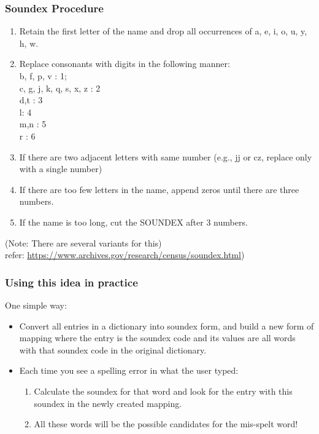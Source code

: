 \documentclass{beamer}
\begin{document}
\begin{frame}
\frametitle{Soundex Procedure}
\begin{enumerate}
\item Retain the first letter of the name and drop all occurrences of a, e, i, o, u, y, h, w. 
\item Replace consonants with digits in the following manner:
\\ b, f, p, v : 1; 
\\ c, g, j, k, q, s, x, z : 2
\\ d,t : 3
\\ l: 4
\\ m,n : 5
\\ r : 6
\item If there are two adjacent letters with same number (e.g., jj or cz, replace only with a single number)
\item If there are too few letters in the name, append zeros until there are three numbers. 	
\item If the name is too long, cut the SOUNDEX after 3 numbers. 
\end{enumerate} 
(Note: There are several variants for this)
\\ refer: \url{https://www.archives.gov/research/census/soundex.html})
\end{frame}

\begin{frame}
\frametitle{Using this idea in practice}
One simple way:
\begin{itemize}
\item Convert all entries in a dictionary into soundex form, and build a new form of mapping where the entry is the soundex code and its values are all words with that soundex code in the original dictionary. \pause
\item Each time you see a spelling error in what the user typed:
\begin{enumerate}
\item Calculate the soundex for that word and look for the entry with this soundex in the newly created mapping. 
\item All these words will be the possible candidates for the mis-spelt word!
\end{enumerate}
\end{itemize}
\end{frame}
\end{document}
